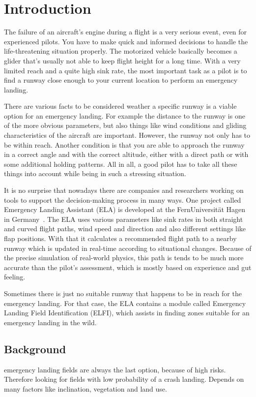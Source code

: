 \section{Introduction}
The failure of an aircraft's engine during a flight is a very serious event, even for experienced pilots. You have to make quick and informed decisions to handle the life-threatening situation properly. The motorized vehicle basically becomes a glider that's usually not able to keep flight height for a long time. With a very limited reach and a quite high sink rate, the most important task as a pilot is to find a runway close enough to your current location to perform an emergency landing.

There are various facts to be considered weather a specific runway is a viable option for an emergency landing. For example the distance to the runway is one of the more obvious parameters, but also things like wind conditions and gliding characteristics of the aircraft are important. However, the runway not only has to be within reach. Another condition is that you are able to approach the runway in a correct angle and with the correct altitude, either with a direct path or with some additional holding patterns. All in all, a good pilot has to take all these things into account while being in such a stressing situation.

It is no surprise that nowadays there are companies and researchers working on tools to support the decision-making process in many ways. One project called Emergency Landing Assistant (ELA) is developed at the FernUniversität Hagen in Germany~\cite{feu_fas}. The ELA uses various parameters like sink rates in both straight and curved flight paths, wind speed and direction and also different settings like flap positions. With that it calculates a recommended flight path to a nearby runway which is updated in real-time according to situational changes. Because of the precise simulation of real-world physics, this path is tends to be much more accurate than the pilot's assessment, which is mostly based on experience and gut feeling.

Sometimes there is just no suitable runway that happens to be in reach for the emergency landing. For that case, the ELA contains a module called Emergency Landing Field Identification (ELFI), which assists in finding zones suitable for an emergency landing in the wild.

\subsection{Background}
\cite{feu_elfi}
emergency landing fields are always the last option, because of high risks. Therefore looking for fields with low probability of a crash landing. Depends on many factors like inclination, vegetation and land use.

